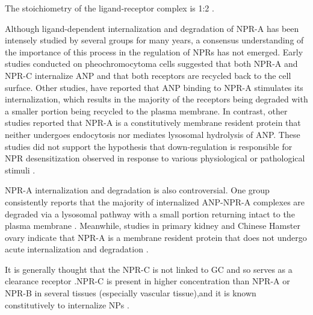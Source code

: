 \documentclass[14pt,a4paper,onecolumn]{extarticle}
\begin{document}


The stoichiometry of the ligand-receptor complex is 1:2 \citep{177}. %


Although ligand-dependent internalization and degradation of NPR-A has been intensely studied by several groups for many years, a consensus understanding of the importance of this process in the regulation of NPRs has not emerged. Early studies conducted on pheochromocytoma cells suggested that both NPR-A and NPR-C internalize ANP and that both receptors are recycled back to the cell surface. Other studies, have reported that ANP binding to NPR-A stimulates its internalization, which results in the majority of the receptors being degraded with a smaller portion being recycled to the plasma membrane. In contrast, other studies reported that NPR-A is a constitutively membrane resident protein that neither undergoes endocytosis nor mediates lysosomal hydrolysis of ANP.  These studies did not support the hypothesis that down-regulation is responsible for NPR desensitization observed in response to various physiological or pathological stimuli \citep{182}.

NPR-A internalization and degradation is also controversial. One group consistently reports that the majority of internalized ANP-NPR-A complexes are degraded via a lysosomal pathway with a small portion returning intact to the plasma membrane \citep{Pandey2002}. Meanwhile, studies in primary kidney and Chinese Hamster ovary indicate that NPR-A is a membrane resident protein that does not undergo acute internalization and degradation \citep{Fan2005} \citep{Vieira2001}. %

It is generally thought that the NPR-C is not linked to GC and so serves as a clearance receptor \citep{bib35} \citep{bib34} \citep{bib33}.NPR-C is present in higher concentration than NPR-A or NPR-B in several tissues (especially vascular tissue),and it is known constitutively to internalize NPs \citep{172}.
\end{document}
